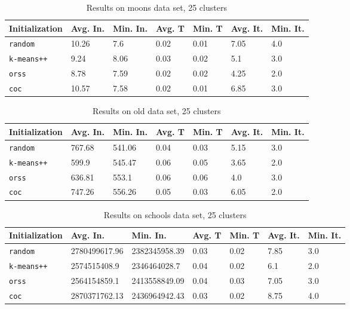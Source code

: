 \documentclass[twoside, 11pt]{article}
\begin{document}
		\begin{table}[p]
			\begin{center}
				\begin{tabular}{|l|l|l|l|l|l|l|}
					\hline
					Initialization & Avg. In. & Min. In. & Avg. T & Min. T & Avg. It. & Min. It.\\\hline
					\texttt{random} & 10.26 & 7.6 & 0.02 & 0.01 & 7.05 & 4.0\\\hline
					\texttt{k-means++} & 9.24 & 8.06 & 0.03 & 0.02 & 5.1 & 3.0\\\hline
					\texttt{orss} & 8.78 & 7.59 & 0.02 & 0.02 & 4.25 & 2.0\\\hline
					\texttt{coc} & 10.57 & 7.58 & 0.02 & 0.01 & 6.85 & 3.0\\\hline
				\end{tabular}
				\caption{Results on moons data set, 25 clusters}
				\label{tbl:moons25}
			\end{center}
		\end{table}
		
		\begin{table}[p]
			\begin{center}
				\begin{tabular}{|l|l|l|l|l|l|l|}
					\hline
					Initialization & Avg. In. & Min. In. & Avg. T & Min. T & Avg. It. & Min. It.\\\hline
					\texttt{random} & 767.68 & 541.06 & 0.04 & 0.03 & 5.15 & 3.0\\\hline
					\texttt{k-means++} & 599.9 & 545.47 & 0.06 & 0.05 & 3.65 & 2.0\\\hline
					\texttt{orss} & 636.81 & 553.1 & 0.06 & 0.06 & 4.0 & 3.0\\\hline
					\texttt{coc} & 747.26 & 556.26 & 0.05 & 0.03 & 6.05 & 2.0\\\hline
				\end{tabular}
				\caption{Results on old data set, 25 clusters}
				\label{tbl:old25}
			\end{center}
		\end{table}
		
		\begin{table}[p]
			\begin{center}
				\begin{tabular}{|l|l|l|l|l|l|l|}
					\hline
					Initialization & Avg. In. & Min. In. & Avg. T & Min. T & Avg. It. & Min. It.\\\hline
					\texttt{random} & 2780499617.96 & 2382345958.39 & 0.03 & 0.02 & 7.85 & 3.0\\\hline
					\texttt{k-means++} & 2574515408.9 & 2346464028.7 & 0.04 & 0.02 & 6.1 & 2.0\\\hline
					\texttt{orss} & 2564154859.1 & 2413558849.09 & 0.04 & 0.03 & 7.05 & 3.0\\\hline
					\texttt{coc} & 2870371762.13 & 2436964942.43 & 0.03 & 0.02 & 8.75 & 4.0\\\hline
				\end{tabular}
				\caption{Results on schools data set, 25 clusters}
				\label{tbl:schools25}
			\end{center}
		\end{table}
		
\end{document}
